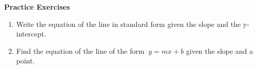 \textbf{Practice Exercises}

\vspce

\begin{enumerate}[label = \Alph*. ]
\item Write the equation of the line in standard form given the slope and the y-intercept. 
\begin{enumerate}[label = \arabic*. ]
\end{enumerate}  

\item Find the equation of  the line of the form  $\ { y  =  mx  +  b}$   given the slope and a point.
\begin{enumerate}[label = \arabic*. ]
\end{enumerate}  


\end{enumerate} 

